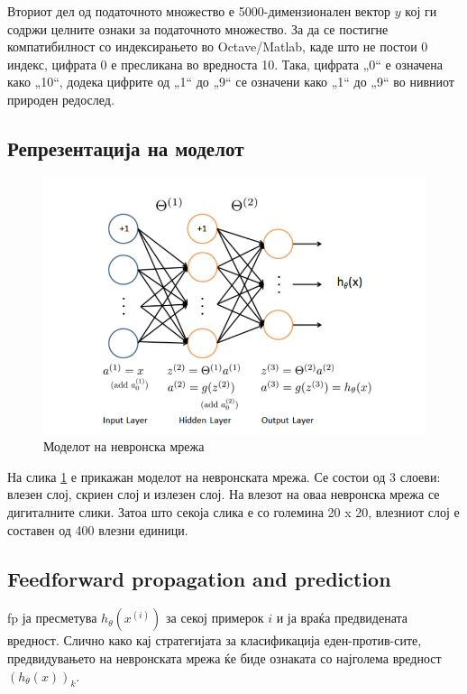 Вториот дел од податочното множество е 5000-димензионален вектор $y$ кој 
ги содржи целните ознаки за податочното множество. За да се постигне
компатибилност со индексирањето во Octave/Matlab, каде што не постои 0 индекс,
цифрата 0 е пресликана во вредноста 10. Така, цифрата „0“ е означена како „10“,
додека цифрите од „1“ до „9“ се означени како „1“ до „9“ во нивниот природен
редослед.

\subsection{Репрезентација на моделот}

\begin{figure}[htb]
\centering
\includegraphics[width=.9\textwidth]{src/neuralNetwork2/neuralNetwork}
\caption{Моделот на невронска мрежа}
\label{fig:neuralNetwork}
\end{figure}

На слика \ref{fig:neuralNetwork} е прикажан моделот на невронската мрежа. Се
состои од 3 слоеви: влезен слој, скриен слој и излезен слој. На влезот на оваа
невронска мрежа се дигиталните слики. Затоа што секоја слика е со големина 20 x
20, влезниот слој е составен од 400 влезни единици.

\subsection{Feedforward propagation and prediction}

fp ја пресметува $h_\theta(x^{(i)})$ за секој примерок $i$ и ја враќа
предвидената вредност. Слично како кај стратегијата за класификација
еден-против-сите, предвидувањето на невронската мрежа ќе биде ознаката со
најголема вредност $(h_\theta(x))_k$.

